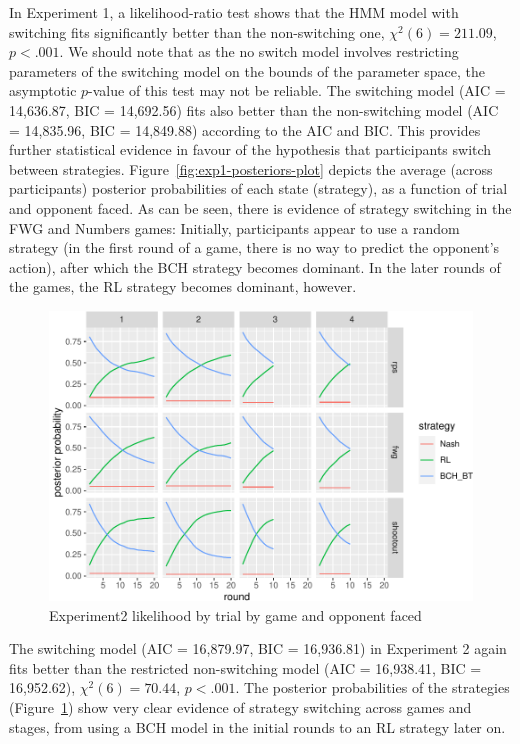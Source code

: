 \documentclass[
  english,
  man,floatsintext]{apa6}
\begin{document}
In Experiment 1, a likelihood-ratio test shows that the HMM model with switching fits significantly better than the non-switching one, \(\chi^2(6) = 211.09\), \(p < .001\). We should note that as the no switch model involves restricting parameters of the switching model on the bounds of the parameter space, the asymptotic \(p\)-value of this test may not be reliable. The switching model (AIC = 14,636.87, BIC = 14,692.56) fits also better than the non-switching model (AIC = 14,835.96, BIC = 14,849.88) according to the AIC and BIC. This provides further statistical evidence in favour of the hypothesis that participants switch between strategies. Figure~\ref{fig:exp1-posteriors-plot} depicts the average (across participants) posterior probabilities of each state (strategy), as a function of trial and opponent faced. As can be seen, there is evidence of strategy switching in the FWG and Numbers games: Initially, participants appear to use a random strategy (in the first round of a game, there is no way to predict the opponent's action), after which the BCH strategy becomes dominant. In the later rounds of the games, the RL strategy becomes dominant, however.

\begin{figure}

{\centering \includegraphics{paper_draft_2021_files/figure-latex/exp2-posteriors-plot-1} 

}

\caption{Experiment2 likelihood by trial by game and opponent faced}\label{fig:exp2-posteriors-plot}
\end{figure}

The switching model (AIC = 16,879.97, BIC = 16,936.81) in Experiment 2 again fits better than the restricted non-switching model (AIC = 16,938.41, BIC = 16,952.62), \(\chi^2(6) = 70.44\), \(p < .001\). The posterior probabilities of the strategies (Figure~\ref{fig:exp2-posteriors-plot}) show very clear evidence of strategy switching across games and stages, from using a BCH model in the initial rounds to an RL strategy later on.
\end{document}

